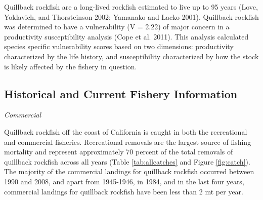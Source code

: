 \documentclass[11pt,
  english,
  a4paper,
]{article}
\begin{document}
\leavevmode\tagmcend\tagstructend\par


Quillback rockfish are a long-lived rockfish estimated to live up to 95 years {(Love, Yoklavich, and Thorsteinson 2002; Yamanako and Lacko 2001)\leavevmode\tagmcend\tagstructend}. Quillback rockfish was determined to have a vulnerability (V = 2.22) of major concern in a productivity susceptibility analysis {(Cope et al. 2011)\leavevmode\tagmcend\tagstructend}. This analysis calculated species specific vulnerability scores based on two dimensions: productivity characterized by the life history, and susceptibility characterized by how the stock is likely affected by the fishery in question.

\leavevmode\tagmcend\tagstructend\par


\hypertarget{historical-and-current-fishery-information}{%
\subsection{Historical and Current Fishery Information}\label{historical-and-current-fishery-information}}

\leavevmode\tagmcend\tagstructend


\emph{Commercial}

\leavevmode\tagmcend\tagstructend\par


Quillback rockfish off the coast of California is caught in both the recreational and commercial fisheries. Recreational removals are the largest source of fishing mortality and represent approximately 70 percent of the total removals of quillback rockfish across all years (Table \ref{tab:allcatches} and Figure \ref{fig:catch}). The majority of the commercial landings for quillback rockfish occurred between 1990 and 2008, and apart from 1945-1946, in 1984, and in the last four years, commercial landings for quillback rockfish have been less than 2 mt per year.

\leavevmode\tagmcend\tagstructend\par
\end{document}
